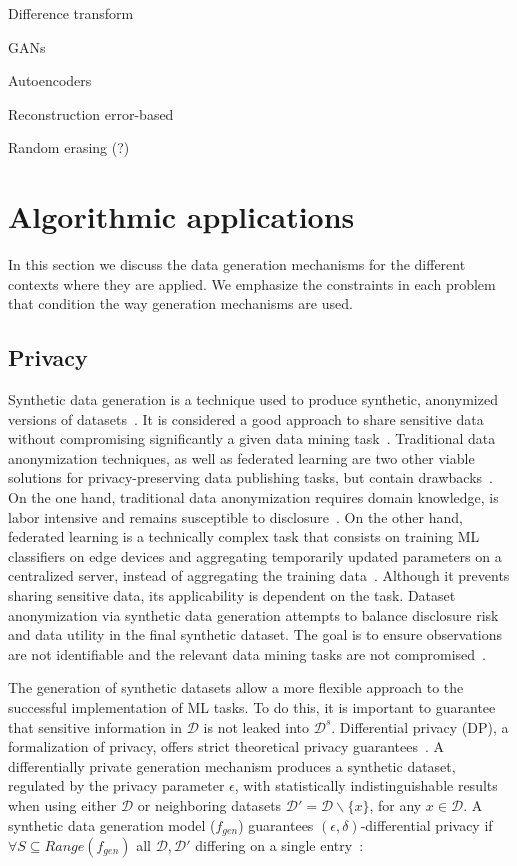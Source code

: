 \documentclass[parskip=full]{scrartcl}
\begin{document}
Difference transform~\cite{cheung2020modals}

GANs

Autoencoders

Reconstruction error-based

Random erasing (?)


\section{Algorithmic applications}\label{sec:algorithmic-applications}

In this section we discuss the data generation mechanisms for the different
contexts where they are applied. We emphasize the constraints in each problem
that condition the way generation mechanisms are used.

\subsection{Privacy}\label{sec:data-privacy}

Synthetic data generation is a technique used to produce synthetic, anonymized
versions of datasets~\cite{dankar2021fake}. It is considered a good approach
to share sensitive data without compromising significantly a given data mining
task~\cite{taub2018differential, park2018data}. Traditional data anonymization
techniques, as well as federated learning are two other viable solutions for
privacy-preserving data publishing tasks, but contain
drawbacks~\cite{hernandez2022synthetic}. On the one hand, traditional data
anonymization requires domain knowledge, is labor intensive and remains
susceptible to disclosure~\cite{reiter2004new}. On the other hand, federated
learning is a technically complex task that consists on training ML
classifiers on edge devices and aggregating temporarily updated parameters on
a centralized server, instead of aggregating the training
data~\cite{yu2022survey}. Although it prevents sharing sensitive data, its
applicability is dependent on the task. Dataset anonymization via synthetic
data generation attempts to balance disclosure risk and data utility in the
final synthetic dataset. The goal is to ensure observations are not
identifiable and the relevant data mining tasks are not
compromised~\cite{singh2017aggregating, li2018privacy}.

The generation of synthetic datasets allow a more flexible approach to the
successful implementation of ML tasks. To do this, it is important to
guarantee that sensitive information in $\mathcal{D}$ is not leaked into
$\mathcal{D}^s$. Differential privacy (DP), a formalization of privacy, offers
strict theoretical privacy guarantees~\cite{rosenblatt2020differentially}. A
differentially private generation mechanism produces a synthetic dataset,
regulated by the privacy parameter $\epsilon$, with statistically
indistinguishable results when using either $\mathcal{D}$ or neighboring
datasets $\mathcal{D}' = \mathcal{D} \backslash \{x\}$, for any $x \in
\mathcal{D}$. A synthetic data generation model ($f_{gen}$) guarantees
$(\epsilon, \delta)$-differential privacy if $\forall S \subseteq
Range(f_{gen})$ all $\mathcal{D}, \mathcal{D}'$ differing on a single
entry~\cite{hardt2012simple}:
\end{document}
